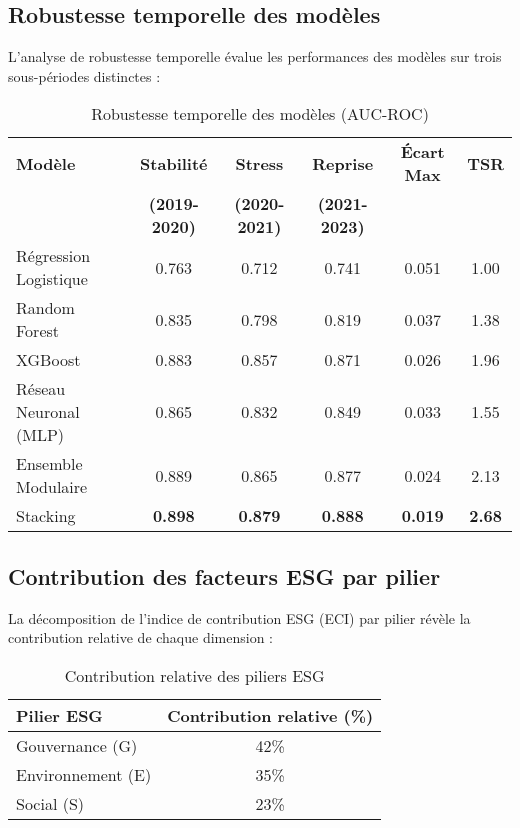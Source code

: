 \subsection{Robustesse temporelle des modèles}

L'analyse de robustesse temporelle évalue les performances des modèles sur trois sous-périodes distinctes :

\begin{table}[h]
\centering
\caption{Robustesse temporelle des modèles (AUC-ROC)}
\begin{tabular}{lccccc}
\toprule
\textbf{Modèle} & \textbf{Stabilité} & \textbf{Stress} & \textbf{Reprise} & \textbf{Écart Max} & \textbf{TSR} \\
& \textbf{(2019-2020)} & \textbf{(2020-2021)} & \textbf{(2021-2023)} & & \\
\midrule
Régression Logistique & 0.763 & 0.712 & 0.741 & 0.051 & 1.00 \\
Random Forest & 0.835 & 0.798 & 0.819 & 0.037 & 1.38 \\
XGBoost & 0.883 & 0.857 & 0.871 & 0.026 & 1.96 \\
Réseau Neuronal (MLP) & 0.865 & 0.832 & 0.849 & 0.033 & 1.55 \\
Ensemble Modulaire & 0.889 & 0.865 & 0.877 & 0.024 & 2.13 \\
Stacking & \textbf{0.898} & \textbf{0.879} & \textbf{0.888} & \textbf{0.019} & \textbf{2.68} \\
\bottomrule
\end{tabular}
\end{table}

\subsection{Contribution des facteurs ESG par pilier}

La décomposition de l'indice de contribution ESG (ECI) par pilier révèle la contribution relative de chaque dimension :

\begin{table}[h]
\centering
\caption{Contribution relative des piliers ESG}
\begin{tabular}{lc}
\toprule
\textbf{Pilier ESG} & \textbf{Contribution relative (\%)} \\
\midrule
Gouvernance (G) & 42\% \\
Environnement (E) & 35\% \\
Social (S) & 23\% \\
\bottomrule
\end{tabular}
\end{table}

